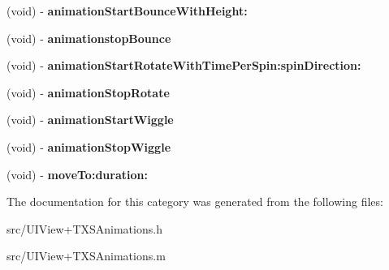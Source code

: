 \begin{DoxyCompactItemize}
\item 
\hypertarget{category_u_i_view_07_t_x_s_animations_08_ae4f810ee1cd0f395e040e99a83b1f453}{}(void) -\/ {\bfseries animation\+Start\+Bounce\+With\+Height\+:}\label{category_u_i_view_07_t_x_s_animations_08_ae4f810ee1cd0f395e040e99a83b1f453}

\item 
\hypertarget{category_u_i_view_07_t_x_s_animations_08_a1cc06e0763598f2e06c1c45807ae75a3}{}(void) -\/ {\bfseries animationstop\+Bounce}\label{category_u_i_view_07_t_x_s_animations_08_a1cc06e0763598f2e06c1c45807ae75a3}

\item 
\hypertarget{category_u_i_view_07_t_x_s_animations_08_a7e6785d7a30172359231332918ce4cc6}{}(void) -\/ {\bfseries animation\+Start\+Rotate\+With\+Time\+Per\+Spin\+:spin\+Direction\+:}\label{category_u_i_view_07_t_x_s_animations_08_a7e6785d7a30172359231332918ce4cc6}

\item 
\hypertarget{category_u_i_view_07_t_x_s_animations_08_a9ad6fdd1fb6dbdffb3ee112cf5507a5e}{}(void) -\/ {\bfseries animation\+Stop\+Rotate}\label{category_u_i_view_07_t_x_s_animations_08_a9ad6fdd1fb6dbdffb3ee112cf5507a5e}

\item 
\hypertarget{category_u_i_view_07_t_x_s_animations_08_a8a83e4fb945122da677de67fae72b142}{}(void) -\/ {\bfseries animation\+Start\+Wiggle}\label{category_u_i_view_07_t_x_s_animations_08_a8a83e4fb945122da677de67fae72b142}

\item 
\hypertarget{category_u_i_view_07_t_x_s_animations_08_a28675ea77609fdc519f7cf5ecb1d70ca}{}(void) -\/ {\bfseries animation\+Stop\+Wiggle}\label{category_u_i_view_07_t_x_s_animations_08_a28675ea77609fdc519f7cf5ecb1d70ca}

\item 
\hypertarget{category_u_i_view_07_t_x_s_animations_08_a6f61520ceb0a005954c3132997e8c542}{}(void) -\/ {\bfseries move\+To\+:duration\+:}\label{category_u_i_view_07_t_x_s_animations_08_a6f61520ceb0a005954c3132997e8c542}

\end{DoxyCompactItemize}


The documentation for this category was generated from the following files\+:\begin{DoxyCompactItemize}
\item 
src/U\+I\+View+\+T\+X\+S\+Animations.\+h\item 
src/U\+I\+View+\+T\+X\+S\+Animations.\+m\end{DoxyCompactItemize}
